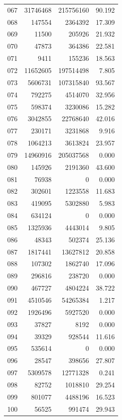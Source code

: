 \documentclass[anonymous,notoc]{gmcm2026}
\begin{document}
\begin{longtable}{lrrr}
067 & 31746468 & 215756160 & 90.192 \\
068 & 147554 & 2364392 & 17.309 \\
069 & 11500 & 205926 & 21.932 \\
070 & 47873 & 364386 & 22.581 \\
071 & 9411 & 155236 & 18.563 \\
072 & 11652605 & 197514498 & 7.805 \\
073 & 5606731 & 107315840 & 93.567 \\
074 & 792275 & 4514070 & 32.956 \\
075 & 598374 & 3230086 & 15.282 \\
076 & 3042855 & 22768640 & 42.016 \\
077 & 230171 & 3231868 & 9.916 \\
078 & 1064213 & 3613824 & 23.957 \\
079 & 14960916 & 205037568 & 0.000 \\
080 & 145926 & 2191360 & 43.600 \\
081 & 76938 & 0 & 0.000 \\
082 & 302601 & 1223558 & 11.683 \\
083 & 419095 & 5302880 & 5.983 \\
084 & 634124 & 0 & 0.000 \\
085 & 1325936 & 4443014 & 9.805 \\
086 & 48343 & 502374 & 25.136 \\
087 & 1817441 & 13627812 & 20.858 \\
088 & 107302 & 1862740 & 17.096 \\
089 & 296816 & 238720 & 0.000 \\
090 & 467727 & 4804224 & 38.722 \\
091 & 4510546 & 54265384 & 1.217 \\
092 & 1926496 & 5927520 & 0.000 \\
093 & 37827 & 8192 & 0.000 \\
094 & 39329 & 928544 & 11.616 \\
095 & 535614 & 0 & 0.000 \\
096 & 28547 & 398656 & 27.807 \\
097 & 5309578 & 12771328 & 0.241 \\
098 & 82752 & 1018810 & 29.254 \\
099 & 801077 & 4488196 & 16.523 \\
100 & 56525 & 991474 & 29.943 \\
\end{longtable}
\end{document}

